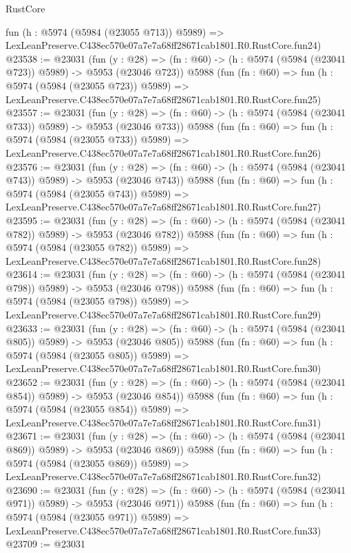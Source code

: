 \begin{lexlean}{RustCore}
\begin{coremodule}
    fun (h : @5974 (@5984 (@23055 @713)) @5989) =>
    LexLeanPreserve.C438ec570e07a7e7a68ff28671cab1801.R0.RustCore.fun24)
@23538 := @23031
    (fun (y : @28) => (fn : @60) -> (h : @5974 (@5984 (@23041 @723)) @5989) -> @5953 (@23046 @723))
    @5988
    (fun (fn : @60) =>
    fun (h : @5974 (@5984 (@23055 @723)) @5989) =>
    LexLeanPreserve.C438ec570e07a7e7a68ff28671cab1801.R0.RustCore.fun25)
@23557 := @23031
    (fun (y : @28) => (fn : @60) -> (h : @5974 (@5984 (@23041 @733)) @5989) -> @5953 (@23046 @733))
    @5988
    (fun (fn : @60) =>
    fun (h : @5974 (@5984 (@23055 @733)) @5989) =>
    LexLeanPreserve.C438ec570e07a7e7a68ff28671cab1801.R0.RustCore.fun26)
@23576 := @23031
    (fun (y : @28) => (fn : @60) -> (h : @5974 (@5984 (@23041 @743)) @5989) -> @5953 (@23046 @743))
    @5988
    (fun (fn : @60) =>
    fun (h : @5974 (@5984 (@23055 @743)) @5989) =>
    LexLeanPreserve.C438ec570e07a7e7a68ff28671cab1801.R0.RustCore.fun27)
@23595 := @23031
    (fun (y : @28) => (fn : @60) -> (h : @5974 (@5984 (@23041 @782)) @5989) -> @5953 (@23046 @782))
    @5988
    (fun (fn : @60) =>
    fun (h : @5974 (@5984 (@23055 @782)) @5989) =>
    LexLeanPreserve.C438ec570e07a7e7a68ff28671cab1801.R0.RustCore.fun28)
@23614 := @23031
    (fun (y : @28) => (fn : @60) -> (h : @5974 (@5984 (@23041 @798)) @5989) -> @5953 (@23046 @798))
    @5988
    (fun (fn : @60) =>
    fun (h : @5974 (@5984 (@23055 @798)) @5989) =>
    LexLeanPreserve.C438ec570e07a7e7a68ff28671cab1801.R0.RustCore.fun29)
@23633 := @23031
    (fun (y : @28) => (fn : @60) -> (h : @5974 (@5984 (@23041 @805)) @5989) -> @5953 (@23046 @805))
    @5988
    (fun (fn : @60) =>
    fun (h : @5974 (@5984 (@23055 @805)) @5989) =>
    LexLeanPreserve.C438ec570e07a7e7a68ff28671cab1801.R0.RustCore.fun30)
@23652 := @23031
    (fun (y : @28) => (fn : @60) -> (h : @5974 (@5984 (@23041 @854)) @5989) -> @5953 (@23046 @854))
    @5988
    (fun (fn : @60) =>
    fun (h : @5974 (@5984 (@23055 @854)) @5989) =>
    LexLeanPreserve.C438ec570e07a7e7a68ff28671cab1801.R0.RustCore.fun31)
@23671 := @23031
    (fun (y : @28) => (fn : @60) -> (h : @5974 (@5984 (@23041 @869)) @5989) -> @5953 (@23046 @869))
    @5988
    (fun (fn : @60) =>
    fun (h : @5974 (@5984 (@23055 @869)) @5989) =>
    LexLeanPreserve.C438ec570e07a7e7a68ff28671cab1801.R0.RustCore.fun32)
@23690 := @23031
    (fun (y : @28) => (fn : @60) -> (h : @5974 (@5984 (@23041 @971)) @5989) -> @5953 (@23046 @971))
    @5988
    (fun (fn : @60) =>
    fun (h : @5974 (@5984 (@23055 @971)) @5989) =>
    LexLeanPreserve.C438ec570e07a7e7a68ff28671cab1801.R0.RustCore.fun33)
@23709 := @23031

\end{coremodule}
\end{lexlean}
